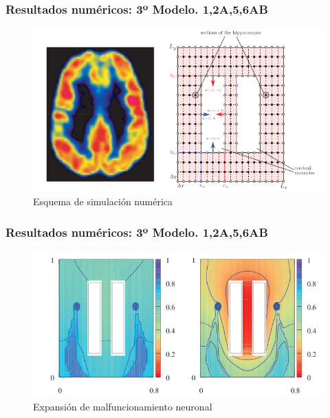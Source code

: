 \documentclass{beamer}
\begin{document}
\begin{frame}
	\frametitle{Resultados numéricos: 3º Modelo. 1,2A,5,6AB}

		\begin{figure}[Atrofia cerebral]
			\includegraphics[scale=0.4]{tercer1.png}
			\caption{Esquema de simulación numérica}
			\label{cerebro4}
		\end{figure}

	
\end{frame}
\begin{frame}
	\frametitle{Resultados numéricos: 3º Modelo. 1,2A,5,6AB}
	
	\begin{figure}[Atrofia cerebral]
		\includegraphics[scale=0.4]{tercer2.png}
		\caption{Expansión de malfuncionamiento neuronal}
		\label{cerebro4}
	\end{figure}
	
	
\end{frame}
\end{document}
